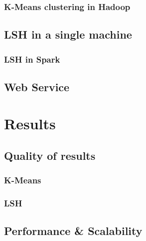 \documentclass[11pt,a4paper,twoside]{scrartcl}
\begin{document}
      \subsubsection{K-Means clustering in Hadoop}
    \subsection{LSH in a single machine}
      \subsubsection{LSH in Spark}
    \subsection{Web Service}
  \section{Results}
    \subsection{Quality of results}
      \subsubsection{K-Means}
      \subsubsection{LSH}
    \subsection{Performance \& Scalability}
\end{document}
